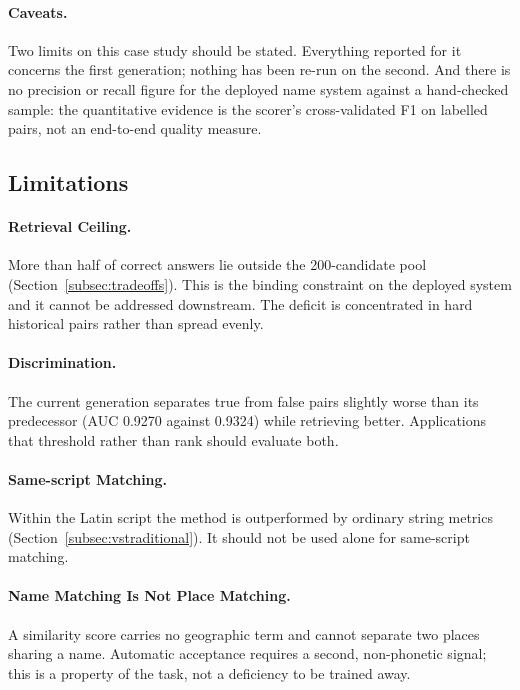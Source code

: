 \documentclass[11pt,a4paper]{article}
\begin{document}
\paragraph{Caveats.} Two limits on this case study should be stated. Everything reported for it concerns the first generation; nothing has been re-run on the second. And there is no precision or recall figure for the deployed name system against a hand-checked sample: the quantitative evidence is the scorer's cross-validated F1 on labelled pairs, not an end-to-end quality measure.

\subsection{Limitations}
\label{subsec:limitations}

\paragraph{Retrieval Ceiling.} More than half of correct answers lie outside the 200-candidate pool (Section~\ref{subsec:tradeoffs}). This is the binding constraint on the deployed system and it cannot be addressed downstream. The deficit is concentrated in hard historical pairs rather than spread evenly.

\paragraph{Discrimination.} The current generation separates true from false pairs slightly worse than its predecessor (AUC 0.9270 against 0.9324) while retrieving better. Applications that threshold rather than rank should evaluate both.

\paragraph{Same-script Matching.} Within the Latin script the method is outperformed by ordinary string metrics (Section~\ref{subsec:vstraditional}). It should not be used alone for same-script matching.

\paragraph{Name Matching Is Not Place Matching.} A similarity score carries no geographic term and cannot separate two places sharing a name. Automatic acceptance requires a second, non-phonetic signal; this is a property of the task, not a deficiency to be trained away.
\end{document}
